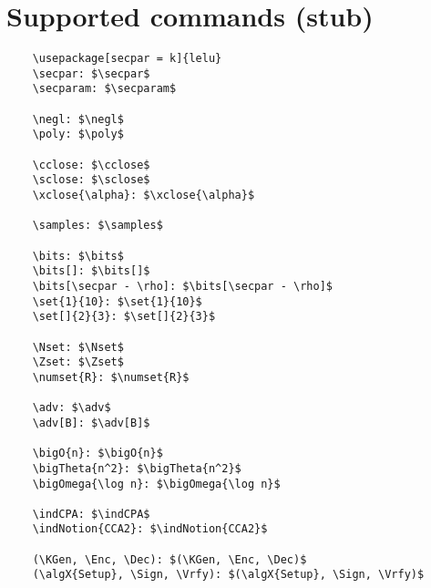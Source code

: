 \documentclass{article}
\begin{document}
\section{Supported commands (stub)}

\begin{lstlisting}
    \usepackage[secpar = k]{lelu}
    \secpar: $\secpar$
    \secparam: $\secparam$

    \negl: $\negl$
    \poly: $\poly$

    \cclose: $\cclose$
    \sclose: $\sclose$
    \xclose{\alpha}: $\xclose{\alpha}$ 

    \samples: $\samples$

    \bits: $\bits$
    \bits[]: $\bits[]$
    \bits[\secpar - \rho]: $\bits[\secpar - \rho]$
    \set{1}{10}: $\set{1}{10}$
    \set[]{2}{3}: $\set[]{2}{3}$

    \Nset: $\Nset$
    \Zset: $\Zset$
    \numset{R}: $\numset{R}$

    \adv: $\adv$
    \adv[B]: $\adv[B]$

    \bigO{n}: $\bigO{n}$
    \bigTheta{n^2}: $\bigTheta{n^2}$ 
    \bigOmega{\log n}: $\bigOmega{\log n}$ 

    \indCPA: $\indCPA$
    \indNotion{CCA2}: $\indNotion{CCA2}$

    (\KGen, \Enc, \Dec): $(\KGen, \Enc, \Dec)$
    (\algX{Setup}, \Sign, \Vrfy): $(\algX{Setup}, \Sign, \Vrfy)$

\end{lstlisting}
\end{document}

